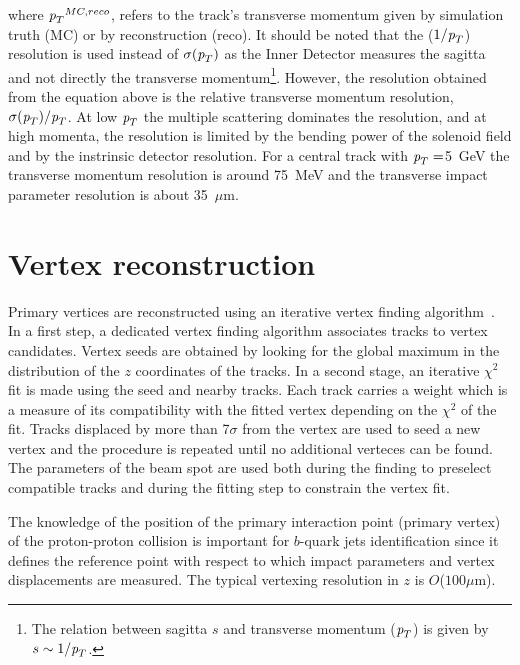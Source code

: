 \begin{itemize}
where ${\emph{p}_{T}}^{MC,reco}$, refers to the track's transverse momentum given by simulation truth (MC) or by reconstruction (reco). It should be noted that the ($1/{\emph{p}_{T}}$) resolution is used instead of $\sigma({\emph{p}_{T}})$ as the Inner Detector measures the sagitta and not directly the transverse momentum\footnote{The relation between sagitta $s$ and transverse momentum (${\emph{p}_{T}}$) is given by $s \sim  1/{\emph{p}_{T}}$. }.  However, the resolution obtained from the equation above is the relative transverse momentum resolution,  $\sigma({\emph{p}_{T}}) / {\emph{p}_{T}}$. At low ${\emph{p}_{T}}$ the multiple scattering dominates the resolution, and at high momenta, the resolution is limited by the bending power of the solenoid field and by the instrinsic detector resolution.  For a central track with ${\emph{p}_{T}}=$5~GeV %
the transverse momentum resolution is around 75~MeV and the transverse impact parameter resolution is about 35~$\mu$m.



\section{Vertex reconstruction}\label{sec:trackreco}

Primary vertices are reconstructed using an iterative vertex finding algorithm~\cite{ATLAS-CONF-2010-069}. In a first step, a dedicated vertex finding algorithm associates tracks to vertex candidates. Vertex seeds are obtained by looking for the global maximum in the distribution of the $z$ coordinates of the tracks. In a second stage, an iterative $\chi^2$ fit is made using the seed and nearby tracks. Each track carries a weight which is a measure of its compatibility with the fitted vertex depending on the $\chi^2$ of the fit. Tracks displaced by more than 7$\sigma$ from the vertex are used to seed a new vertex and the procedure is repeated until no additional verteces can be found.  %
The parameters of the beam spot are used both during the finding to preselect compatible tracks and during the fitting step to constrain the vertex fit.


The knowledge of the position of the primary interaction point (primary vertex) of the proton-proton collision is important for $b$-quark jets identification since it defines the reference point with respect to which impact parameters and vertex displacements are measured.  The typical vertexing resolution in $z$ is $O$($100 \mu$m).



\end{itemize}

